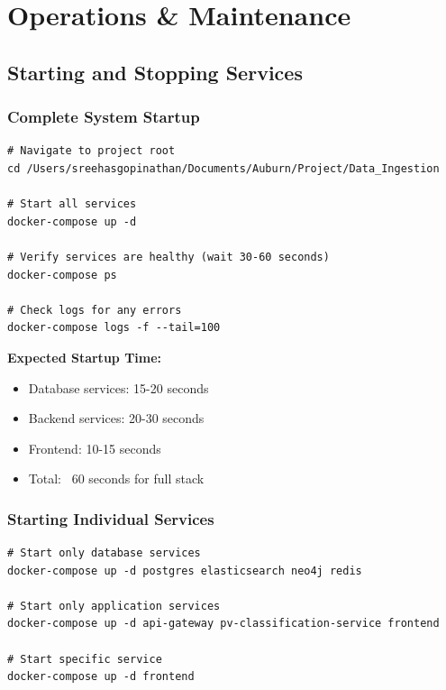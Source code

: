 
\chapter{Operations \& Maintenance}

\section{Starting and Stopping Services}

\subsection{Complete System Startup}

\begin{commandbox}
\begin{lstlisting}[style=bashstyle]
# Navigate to project root
cd /Users/sreehasgopinathan/Documents/Auburn/Project/Data_Ingestion

# Start all services
docker-compose up -d

# Verify services are healthy (wait 30-60 seconds)
docker-compose ps

# Check logs for any errors
docker-compose logs -f --tail=100
\end{lstlisting}
\end{commandbox}

\textbf{Expected Startup Time:}
\begin{itemize}
    \item Database services: 15-20 seconds
    \item Backend services: 20-30 seconds
    \item Frontend: 10-15 seconds
    \item Total: ~60 seconds for full stack
\end{itemize}

\subsection{Starting Individual Services}

\begin{commandbox}
\begin{lstlisting}[style=bashstyle]
# Start only database services
docker-compose up -d postgres elasticsearch neo4j redis

# Start only application services
docker-compose up -d api-gateway pv-classification-service frontend

# Start specific service
docker-compose up -d frontend
\end{lstlisting}
\end{commandbox}

